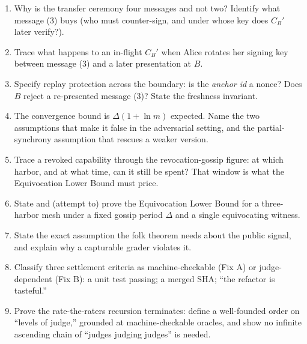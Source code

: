 \begin{enumerate}[label=\textbf{IV.\arabic*},leftmargin=2.8em,itemsep=6pt,topsep=4pt]
\item \wbcheck Why is the transfer ceremony four messages and not two? Identify what
  message (3) buys (who must counter-sign, and under whose key does $C_B'$ later
  verify?).

\item \wbtrace Trace what happens to an in-flight $C_B'$ when Alice rotates her
  signing key between message (3) and a later presentation at $B$.

\item \wbopen\wbstar Specify replay protection across the boundary: is the
  \emph{anchor id} a nonce? Does $B$ reject a re-presented message (3)? State the
  freshness invariant.

\item \wbcheck The convergence bound is $\Delta(1+\ln m)$ expected. Name the two
  assumptions that make it false in the adversarial setting, and the partial-synchrony
  assumption that rescues a weaker version.

\item \wbtrace Trace a revoked capability through the revocation-gossip figure: at
  which harbor, and at what time, can it still be spent? That window is what the
  Equivocation Lower Bound must price.

\item \wbopen\wbstar State and (attempt to) prove the Equivocation Lower Bound for a
  three-harbor mesh under a fixed gossip period $\Delta$ and a single equivocating
  witness.

\item \wbcheck State the exact assumption the folk theorem needs about the public
  signal, and explain why a capturable grader violates it.

\item \wbcheck Classify three settlement criteria as machine-checkable (Fix A) or
  judge-dependent (Fix B): a unit test passing; a merged SHA; ``the refactor is
  tasteful.''

\item \wbopen\wbstar Prove the rate-the-raters recursion terminates: define a
  well-founded order on ``levels of judge,'' grounded at machine-checkable oracles,
  and show no infinite ascending chain of ``judges judging judges'' is needed.


\end{enumerate}
